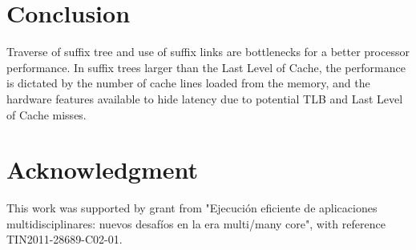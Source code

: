\documentclass[conference]{IEEEtran}
\begin{document}
 
\section{Conclusion}
Traverse of suffix tree and use of suffix links are bottlenecks for a better processor performance. In suffix trees larger than the Last Level of Cache, the performance is dictated by the number of cache lines loaded from the memory, and the hardware features available to hide latency due to potential TLB and Last Level of Cache misses.
\section*{Acknowledgment}
This work was supported by grant from "Ejecuci\'on eficiente de aplicaciones multidisciplinares: nuevos desaf\'ios en la era multi/many core", with reference TIN2011-28689-C02-01.




\end{document}
